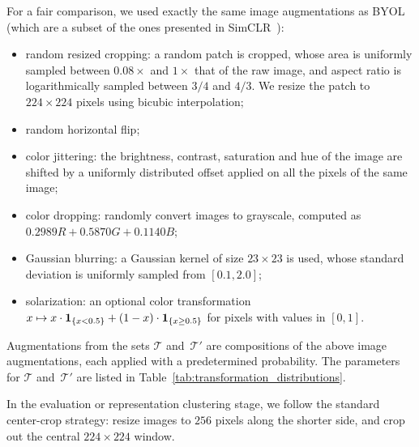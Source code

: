 \documentclass[final]{cvpr}
\newcommand{\bOne}{{\bf 1}}
\begin{document}
For a fair comparison, we used exactly the same image augmentations as BYOL~\cite{grill2020bootstrap} (which are a subset of the ones presented in SimCLR~\cite{chen2020simple}):
\begin{itemize}
    \item random resized cropping: a random patch is cropped, whose area is uniformly sampled between $0.08\times$ and $1\times$ that of the raw image, and aspect ratio is logarithmically sampled between $3/4$ and $4/3$. We resize the patch to $224 \times 224$ pixels using bicubic interpolation;
    \item random horizontal flip;
    \item color jittering: the brightness, contrast, saturation and hue of the image are shifted by a uniformly distributed offset applied on all the pixels of the same image;
    \item color dropping: randomly convert images to grayscale, computed as $0.2989 R + 0.5870 G + 0.1140 B$;
    
    \item Gaussian blurring: a Gaussian kernel of size $23 \times 23$ is used, whose standard deviation is uniformly sampled from $[0.1, 2.0]$;
    \item solarization: an optional color transformation $x \mapsto x \cdot \bOne_{\{x < 0.5\}} + (1 - x) \cdot \bOne_{\{x \ge 0.5\}}$ for pixels with values in $[0, 1]$.
\end{itemize}

Augmentations from the sets $\mathcal{T}$ and~$\mathcal{T}'$ are compositions of the above image augmentations, each applied with a predetermined probability. The parameters for $\mathcal{T}$ and~$\mathcal{T}'$ are listed in Table~\ref{tab:transformation_distributions}.

In the evaluation or representation clustering stage, we follow the standard center-crop strategy: resize images to $256$ pixels along the shorter side, and crop out the central $224 \times 224$ window.
\end{document}
